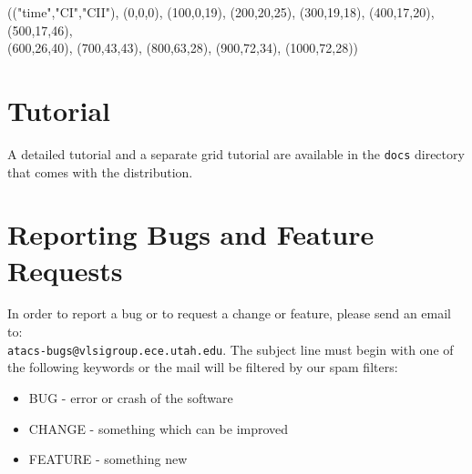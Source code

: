 \documentclass[titlepage,11pt]{article}
\begin{document}
(("time","CI","CII"), (0,0,0), (100,0,19), (200,20,25), (300,19,18), (400,17,20), (500,17,46), \\
(600,26,40), (700,43,43), (800,63,28), (900,72,34), (1000,72,28))

\section{Tutorial}

\noindent
A detailed 
tutorial
and a separate
grid tutorial
are available in the {\tt docs} directory that comes with the distribution.

\section{Reporting Bugs and Feature Requests}

\noindent
In order to report a bug or to request a change or feature, please
send an email to:\\ 
{\tt atacs-bugs@vlsigroup.ece.utah.edu}.
The subject line must begin with one of the following keywords or the
mail will be filtered by our spam filters:
\begin{itemize}
\item BUG - error or crash of the software
\item CHANGE - something which can be improved
\item FEATURE - something new
\end{itemize}
 
\end{document}
